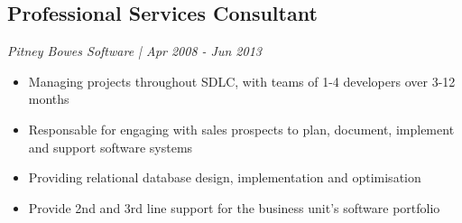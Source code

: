 %
%
\subsection{Professional Services Consultant}
\textit{Pitney Bowes Software | Apr 2008 - Jun 2013}
\begin{itemize}
	\item Managing projects throughout SDLC, with teams of 1-4 developers over 3-12 months
	\item Responsable for engaging with sales prospects to plan, document, implement and support software systems
	\item Providing relational database design, implementation and optimisation
	\item Provide 2nd and 3rd line support for the business unit's software portfolio
\end{itemize}
